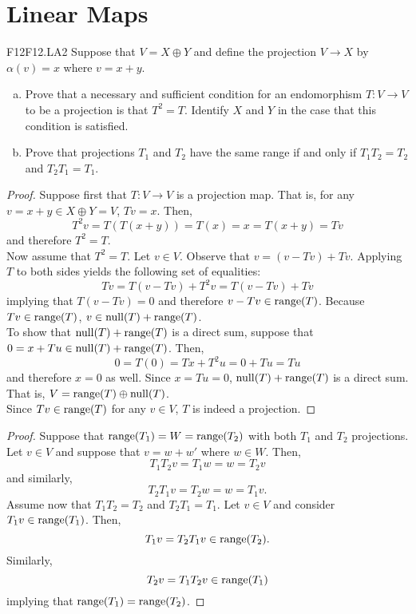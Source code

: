 \documentclass[../AlgebraQualSolutions.tex]{subfiles}
\begin{document}
\section{Linear Maps}

	\begin{prob}{F12}{F12.LA2}
	Suppose that $V = X \oplus Y$ and define the projection $V \to X$ by $\alpha(v) = x$ where $v = x+y$.
	\begin{enumerate}[(a)]
	\item Prove that a necessary and sufficient condition for an endomorphism $T: V \to V$ to be a projection is that $T^2 = T$. Identify $X$ and $Y$ in the case that this condition is satisfied.
	\item Prove that projections $T_1$ and $T_2$ have the same range if and only if $T_1T_2 = T_2$ and $T_2T_1 = T_1$.
	\end{enumerate}
	\end{prob}

	\begin{proof}
		Suppose first that $T: V \to V$ is a projection map. That is, for any $v = x + y \in X \oplus Y = V$, $Tv = x$. Then,
			\[T^2v = T(T(x+y)) = T(x) = x = T(x+y) = Tv\]
		and therefore $T^2 = T$.\\

		Now assume that $T^2=T$. Let $v  \in V$. Observe that $v = (v - Tv) + Tv$. Applying $T$ to both sides yields the following set of equalities:
			\[Tv = T(v-Tv) + T^2v = T(v-Tv) + Tv\]
		implying that $T(v-Tv) =0$ and therefore $v-Tv \in \mathrm{range}(T)$. Because $Tv \in \mathrm{range}(T)$, $v \in \mathrm{null}(T) + \mathrm{range}(T)$.\\
		
		To show that $\mathrm{null}(T) + \mathrm{range}(T)$ is a direct sum, suppose that $0 = x + Tu \in \mathrm{null}(T) + \mathrm{range}(T)$. Then,	
			\[0 = T(0) = Tx + T^2u = 0 + Tu = Tu \]
		and therefore $x = 0$ as well. Since $x = Tu = 0$, $\mathrm{null}(T) + \mathrm{range}(T)$ is a direct sum. That is, $V = \mathrm{range}(T) \oplus \mathrm{null}(T)$.\\

		Since $Tv \in \mathrm{range}(T)$ for any $v \in V$, $T$ is indeed a projection.
	\end{proof}

	\begin{proof}
		Suppose that $\mathrm{range}(T_1) = W = \mathrm{range}(T_2)$ with both $T_1$ and $T_2$ projections. Let $v \in V$ and suppose that $v = w + w'$ where $w \in W$. Then,
			\[T_1T_2v = T_1w = w = T_2v\]
		and similarly,
			\[T_2T_1v = T_2w = w = T_1v.\]
		Assume now that $T_1T_2 = T_2$ and $T_2T_1 = T_1$. Let $v \in V$ and consider $T_1v \in \mathrm{range}(T_1)$. Then,
			\[T_1v = T_2T_1v \in \mathrm{range}(T_2).\]
		Similarly,
			\[T_2v = T_1T_2v \in \mathrm{range}(T_1) \]
		implying that $\mathrm{range}(T_1) = \mathrm{range}(T_2)$.
	\end{proof}
\end{document}
